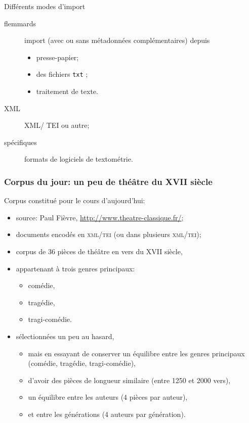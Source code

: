 \documentclass{beamer}
\begin{document}
\begin{frame}{Différents modes d'import}
	
	\begin{description}
		\item[flemmards] import (avec ou sans métadonnées complémentaires)
		depuis 
		\begin{itemize}
			\item presse-papier;
			\item des fichiers \texttt{txt} ;
			\item traitement de texte.
		\end{itemize}
		\item[XML] XML/ TEI ou autre;
		\item[spécifiques] formats de logiciels de textométrie.
	\end{description}
	
\end{frame}


\begin{frame}[fragile]
\frametitle{Corpus du jour: un peu de théâtre du XVII\ieme{} siècle}

Corpus constitué pour le cours d'aujourd'hui:

\begin{itemize}
	\item source: Paul Fièvre,  \url{http://www.theatre-classique.fr/};
	\item documents encodés en \textsc{xml}/\textsc{tei} (ou dans plusieurs \textsc{xml/tei});
	\item corpus de \alert{36} pièces de théâtre en vers du XVII\ieme{} siècle,
	\item appartenant à trois genres principaux:
		\begin{itemize}
			\item comédie,
			\item tragédie,
			\item tragi-comédie.
		\end{itemize}
	\item sélectionnées un peu au hasard,
	\begin{itemize}
		\item mais en essayant de conserver un équilibre entre les genres principaux (comédie, tragédie, tragi-comédie),
		\item d'avoir des pièces de longueur similaire (entre 1250 et 2000 vers),
		\item un équilibre entre les auteurs (4 pièces par auteur),
		\item et entre les générations (4 auteurs par génération).
	\end{itemize}
\end{itemize}

\end{frame}
\end{document}
